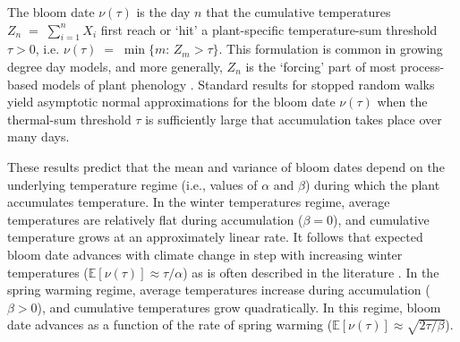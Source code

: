 \documentclass[
]{article}
\begin{document}
The bloom date $\nu(\tau)$ is the day $n$ that the cumulative temperatures $Z_n \;=\; \sum_{i=1}^n X_i$ first reach or `hit' %
a plant-specific temperature-sum threshold $\tau > 0$, i.e. $\nu(\tau) \;=\; \min\{m:\, Z_m> \tau \}$. %
This formulation is common in growing degree day models, and more generally, $Z_n$ is the `forcing' part of most process-based models of plant phenology \citep{schwartzbook}. 
Standard results for stopped random walks yield asymptotic normal approximations for the bloom date \(\nu(\tau)\) when the thermal-sum threshold $\tau$ is sufficiently large that accumulation takes place over many days. %

These results predict that the mean and variance of bloom dates depend on the underlying temperature regime (i.e., values of \(\alpha\) and \(\beta\)) during which the plant accumulates temperature. In the winter temperatures regime, average temperatures are relatively flat during accumulation ($\beta = 0$), and cumulative temperature grows at an approximately linear rate. It follows that expected bloom date advances with climate change in step with increasing winter temperatures ($\mathbb{E}[\nu(\tau)] \approx \tau / \alpha$) as is often described in the literature \citep{vitasse2022great}. In the spring warming regime, average temperatures increase during accumulation ($\beta > 0$), and cumulative temperatures grow quadratically. In this regime, bloom date advances as a function of the rate of spring warming ($\mathbb{E}[\nu(\tau)] \approx \sqrt{ 2 \tau / \beta}$). 
\end{document}
